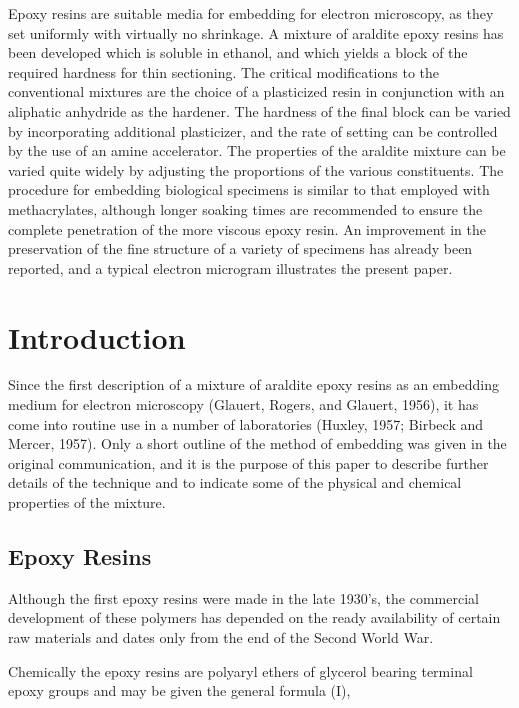 \documentclass{article}
\begin{document}
Epoxy resins are suitable media for embedding for electron microscopy, as they set uniformly with virtually no shrinkage. A mixture of araldite epoxy resins has been developed which is soluble in ethanol, and which yields a block of the required hardness for thin sectioning. The critical modifications to the conventional mixtures are the choice of a plasticized resin in conjunction with an aliphatic anhydride as the hardener. The hardness of the final block can be varied by incorporating additional plasticizer, and the rate of setting can be controlled by the use of an amine accelerator. The properties of the araldite mixture can be varied quite widely by adjusting the proportions of the various constituents. The procedure for embedding biological specimens is similar to that employed with methacrylates, although longer soaking times are recommended to ensure the complete penetration of the more viscous epoxy resin. An improvement in the preservation of the fine structure of a variety of specimens has already been reported, and a typical electron microgram illustrates the present paper.

\section*{Introduction}

Since the first description of a mixture of araldite epoxy resins as an embedding medium for electron microscopy (Glauert, Rogers, and Glauert, 1956), it has come into routine use in a number of laboratories (Huxley, 1957; Birbeck and Mercer, 1957). Only a short outline of the method of embedding was given in the original communication, and it is the purpose of this paper to describe further details of the technique and to indicate some of the physical and chemical properties of the mixture.

\subsection*{Epoxy Resins}

Although the first epoxy resins were made in the late 1930's, the commercial development of these polymers has depended on the ready availability of certain raw materials and dates only from the end of the Second World War.

Chemically the epoxy resins are polyaryl ethers of glycerol bearing terminal epoxy groups and may be given the general formula (I),
\end{document}
